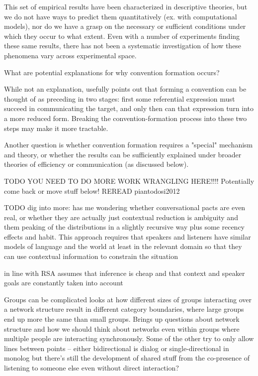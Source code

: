\documentclass[]{article}
\begin{document}
This set of empirical results have been characterized in descriptive theories, but we do not have ways to predict them quantitatively (ex. with computational models), nor do we have a grasp on the necessary or sufficient conditions under which they occur to what extent. Even with a number of experiments finding these same results, there has not been a systematic investigation of how these phenomena vary across experimental space. 

What are potential explanations for why convention formation occurs?

While not an explanation, \cite{leung2023} usefully points out that forming a convention can be thought of as preceding in two stages: first some referential expression must succeed in communicating the target, and only then can that expression turn into a more reduced form. Breaking the convention-formation process into these two steps may make it more tractable. 

Another question is whether convention formation requires a "special" mechanism and theory, or whether the results can be sufficiently explained under broader theories of efficiency or communication (as discussed below). 

TODO YOU NEED TO DO MORE WORK WRANGLING HERE!!!! Potentially come back or move stuff below!
REREAD piantodosi2012 

TODO dig into more: \cite{piantadosi2012} has me wondering whether conversational pacts are even real, or whether they are actually just contextual reduction is ambiguity and them peaking of the distributions in a slightly recursive way plus some recency effects and habit. This approach requires that speakers and listeners have similar models of language and the world at least in the relevant domain so that they can use contextual information to constrain the situation 

\cite{piantadosi2012} in line with RSA assumes that inference is cheap and that context and speaker goals are constantly taken into account 

Groups can be complicated \cite{guilbeault2021} looks at how different sizes of groups interacting over a network structure result in different category boundaries, where large groups end up more the same than small groups. Brings up questions about network structure and how we should think about networks even within groups where multiple people are interacting synchronously. Some of the other try to only allow lines between points -- either bidirectional is dialog or single-directional in monolog but there's still the development of shared stuff from the co-presence of listening to someone else even without direct interaction? 
\end{document}
